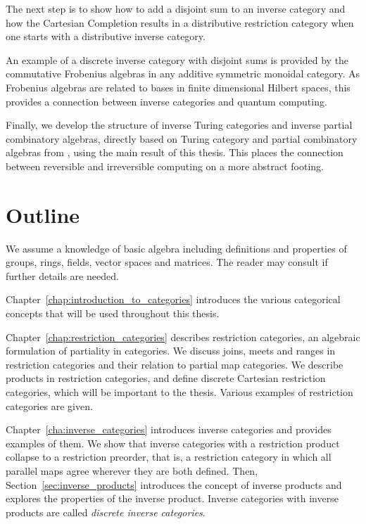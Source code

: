 The next step is to show how to add a disjoint sum to an inverse category and how the
Cartesian Completion results in a distributive restriction category when one starts with a
distributive inverse category.

An example of a discrete inverse category with disjoint sums is provided by the commutative
Frobenius algebras in any additive symmetric monoidal category. As Frobenius algebras are related to
bases in finite dimensional Hilbert spaces\cite{coeckeetal08:ortho}, this provides a connection
between inverse categories and quantum computing.

Finally, we develop the structure of inverse Turing categories and inverse partial combinatory
algebras, directly based on Turing category and partial combinatory algebras  from
\cite{cockett-hostra08-intro-to-turing,cockett2010:categories-and-computability}, using the main
result of this thesis. This places the connection between reversible and irreversible
computing on a more abstract footing.


\section{Outline} %
\label{sec:outline}

We assume a knowledge of basic algebra including definitions and properties of groups, rings,
fields, vector spaces and matrices. The reader may consult \cite{lang:algebra} if further details
are needed.

Chapter~\ref{chap:introduction_to_categories} introduces the various categorical concepts that will
be used throughout this thesis.

Chapter~\ref{chap:restriction_categories} describes restriction categories, an algebraic
formulation of partiality in categories. We discuss joins, meets and ranges in
restriction categories and their relation to partial map categories. We describe products in
restriction categories, and define discrete Cartesian restriction categories, which will be
important to the thesis. Various examples of restriction categories are given.

Chapter~\ref{cha:inverse_categories} introduces inverse categories and provides examples of them. We
show that inverse categories with a restriction product collapse to a restriction preorder, that
is, a restriction category in which all parallel maps agree wherever they are both defined. Then,
Section~\ref{sec:inverse_products} introduces the concept of inverse products and explores the
properties of the inverse product. Inverse categories with inverse products are called
\emph{discrete inverse categories}.

